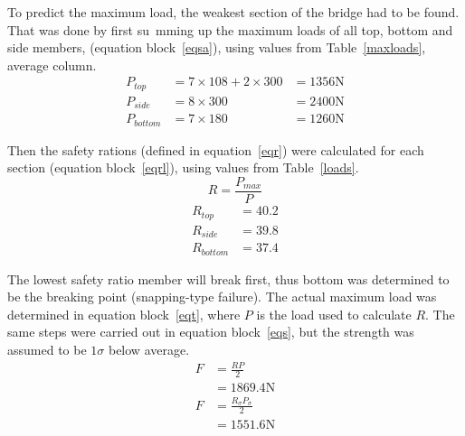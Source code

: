 \documentclass[12pt]{article}
\begin{document}
		To predict the maximum load, the weakest section of the bridge had to be found. That was done by first su~mming up the maximum loads of all top, bottom and side members, (equation block~\ref{eqsa}), using values from Table~\ref{maxloads}, average column.
		\begin{subequations}
			\begin{align}
				P_{top}&=7\times108+2\times300
				&=1356\mathrm{N}\\
				P_{side}&=8\times300
				&=2400\mathrm{N}\\
				P_{bottom}&=7\times180
				&=1260\mathrm{N}
			\end{align}
			\label{eqsa}
		\end{subequations}

		Then the safety rations (defined in equation~\ref{eqr}) were calculated for each section (equation block~\ref{eqrl}), using values from Table~\ref{loads}.
		\begin{equation}
			R=\frac{P_{max}}{P}
			\label{eqr}
		\end{equation}
		\begin{subequations}
			\begin{align}
				R_{top}&=40.2\\
				R_{side}&=39.8\\
				R_{bottom}&=37.4
			\end{align}
			\label{eqrl}
		\end{subequations}

		The lowest safety ratio member will break first, thus bottom was determined to be the breaking point (snapping-type failure). The actual maximum load was determined in equation block~\ref{eqt}, where $P$ is the load used to calculate $R$. The same steps were carried out in equation block~\ref{eqs}, but the strength was assumed to be $1\sigma$ below average.
		\begin{subequations}
			\begin{align}
				F&=\frac{R P}{2} \\
				&=1869.4 \mathrm{N}
			\end{align}
			\label{eqt}
		\end{subequations}
		\begin{subequations}
			\begin{align}
				F&=\frac{R_{\sigma} P_{\sigma}}{2} \\
				&=1551.6 \mathrm{N}
			\end{align}
			\label{eqs}
		\end{subequations}
\end{document}
